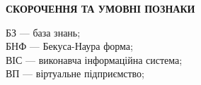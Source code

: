 \begin{center}
{\Large \textbf{СКОРОЧЕННЯ ТА УМОВНІ ПОЗНАКИ}}
\end{center}

\vspace{1.5\baselineskip}

{\Large

\noindent БЗ --- база знань; \\
БНФ --- Бекуса-Наура форма; \\
ВІС --- виконавча інформаційна система; \\
ВП --- віртуальне підприємство;

}
